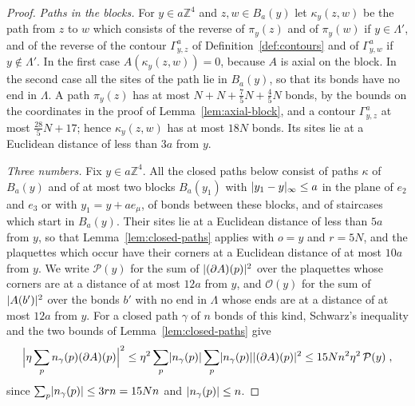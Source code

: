 \documentclass[11pt]{preprint}
\DeclarePairedDelimiter{\abs}{\lvert}{\rvert}
\numberwithin{equation}{section}
\theoremstyle{definition}
\theoremstyle{remark}
\theoremstyle{plain}
\begin{document}
\begin{proof}
\emph{Paths in the blocks.} For $y \in a\mathbb Z^4$ and $z, w \in B_a(y)$ let $\kappa_y(z, w)$ be the path from $z$ to $w$ which consists of the reverse of $\pi_y(z)$ and of $\pi_y(w)$ if $y \in \Lambda'$, and of the reverse of the contour $\Gamma^a_{y,z}$ of Definition~\ref{def:contours} and of $\Gamma^a_{y,w}$ if $y \notin \Lambda'$. In the first case $A(\kappa_y(z, w)) = 0$, because $A$ is axial on the block. In the second case all the sites of the path lie in $B_a(y)$, so that its bonds have no end in $\Lambda$. A path $\pi_y(z)$ has at most $N + N + \frac75N + \frac45N$ bonds, by the bounds on the coordinates in the proof of Lemma~\ref{lem:axial-block}, and a contour $\Gamma^a_{y,z}$ at most $\frac{28}{5}N + 17$; hence $\kappa_y(z, w)$ has at most $18N$ bonds. Its sites lie at a Euclidean distance of less than $3a$ from $y$.

\emph{Three numbers.} Fix $y \in a\mathbb Z^4$. All the closed paths below consist of paths $\kappa$ of $B_a(y)$ and of at most two blocks $B_a(y_1)$ with $\abs{y_1 - y}_\infty \leq a$ in the plane of $e_2$ and $e_3$ or with $y_1 = y + ae_\mu$, of bonds between these blocks, and of staircases which start in $B_a(y)$. Their sites lie at a Euclidean distance of less than $5a$ from $y$, so that Lemma~\ref{lem:closed-paths} applies with $o = y$ and $r = 5N$, and the plaquettes which occur have their corners at a Euclidean distance of at most $10a$ from $y$. We write $\mathcal P(y)$ for the sum of $\abs{(\partial A)(p)}^2$ over the plaquettes whose corners are at a distance of at most $12a$ from $y$, and $\mathcal O(y)$ for the sum of $\abs{A(b')}^2$ over the bonds $b'$ with no end in $\Lambda$ whose ends are at a distance of at most $12a$ from $y$. For a closed path $\gamma$ of $n$ bonds of this kind, Schwarz's inequality and the two bounds of Lemma~\ref{lem:closed-paths} give
\begin{equation}\label{eq:closed-path-bound}
    \Bigl\lvert\eta\sum_pn_\gamma(p)(\partial A)(p)\Bigr\rvert^2 \leq \eta^2\sum_p\abs{n_\gamma(p)}\sum_p\abs{n_\gamma(p)}\abs{(\partial A)(p)}^2 \leq 15Nn^2\eta^2\,\mathcal P(y)\;,
\end{equation}
since $\sum_p\abs{n_\gamma(p)} \leq 3rn = 15Nn$ and $\abs{n_\gamma(p)} \leq n$.


\end{proof}
\end{document}
